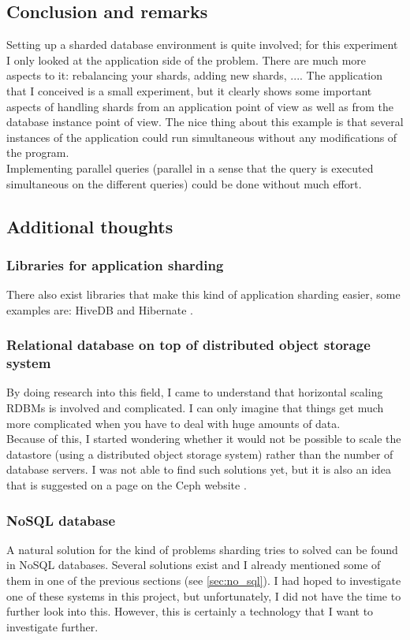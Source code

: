 \documentclass[12pt]{report}
\begin{document}
\subsection{Conclusion and remarks}
Setting up a sharded database environment is quite involved; for this experiment I only
looked at the application side of the problem. There are much more
aspects to it: rebalancing your shards, adding new shards, ....
The application that I conceived is a small experiment, but it clearly
shows some important aspects of handling shards from an application
point of view as well as from the database instance point of view.
The nice thing about this example is that several instances of the
application could run simultaneous without any modifications of the
program.\\
Implementing parallel queries (parallel in a sense that the query is
executed simultaneous on the different queries) could be done without
much effort.

\subsection{Additional thoughts}
\subsubsection{Libraries for application sharding}
There also exist libraries that make this kind
of application sharding easier, some examples are: HiveDB
\cite{hivedb} and Hibernate \cite{hibernate_tenants}.

\subsubsection{Relational database on top of distributed object
  storage system} 
By doing research into this field, I came to understand that
horizontal scaling RDBMs is involved and complicated. I can only
imagine that things get much more complicated when you have to deal
with huge amounts of data.\\
Because of this, I started wondering whether it would not be possible
to scale the datastore (using a distributed object storage system)
rather than the number of database servers. 
I was not able to find such solutions yet, but it is also an idea that
is suggested on a page on the Ceph website
\cite{ceph_more_than_an_object_store}.

\subsubsection{NoSQL database}
A natural solution for the kind of problems sharding tries to solved
can be found in NoSQL databases. Several solutions exist and I
already mentioned some of them in one of the previous sections
(see \cref{sec:no_sql}).
I had hoped to investigate one of these systems in this project, but
unfortunately, I did not have the time to further look into this. 
However, this is certainly a technology that I want to 
investigate further. 
\end{document}
